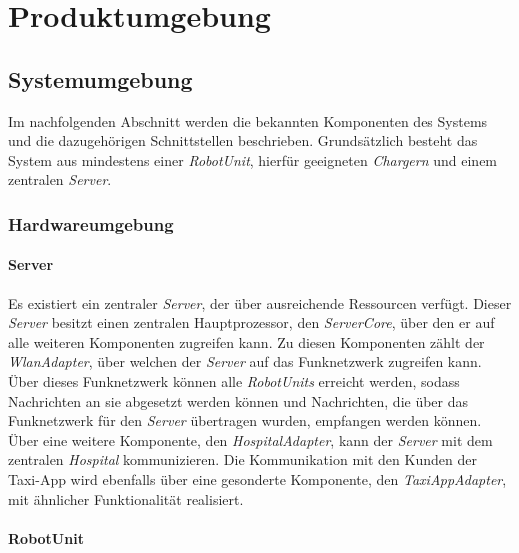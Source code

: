 \section{Produktumgebung}

  \subsection{Systemumgebung}
  Im nachfolgenden Abschnitt werden die bekannten Komponenten des Systems
  und die dazugehörigen Schnittstellen beschrieben.
  Grundsätzlich besteht
  das System aus mindestens einer \emph{RobotUnit}, hierfür geeigneten
  \emph{Chargern} und einem zentralen \emph{Server}.

  \subsubsection{Hardwareumgebung}

  \paragraph{Server}\label{server}

  Es existiert ein zentraler \emph{Server}, der über ausreichende Ressourcen verfügt.
  Dieser \emph{Server} besitzt einen zentralen Hauptprozessor, den \emph{ServerCore}, über den er auf alle weiteren Komponenten zugreifen kann.
  Zu diesen Komponenten zählt der \emph{WlanAdapter}, über welchen der \emph{Server} auf das Funknetzwerk zugreifen kann.
  Über dieses Funknetzwerk können alle \emph{RobotUnits} erreicht werden, sodass Nachrichten an sie abgesetzt werden können und Nachrichten, die über das Funknetzwerk für den \emph{Server} übertragen wurden, empfangen werden können.
  Über eine weitere Komponente, den \emph{HospitalAdapter}, kann der \emph{Server} mit dem zentralen \emph{Hospital} kommunizieren.
  Die Kommunikation mit den Kunden der Taxi-App wird ebenfalls über eine gesonderte Komponente, den \emph{TaxiAppAdapter}, mit ähnlicher Funktionalität realisiert.

  \paragraph{RobotUnit}\label{robotunit}

